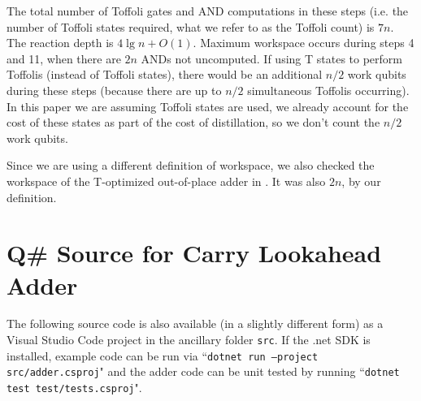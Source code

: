 \documentclass[onecolumn,unpublished]{quantumarticle}
\theoremstyle{definition}
\theoremstyle{definition}
\theoremstyle{definition}
\begin{document}
The total number of Toffoli gates and AND computations in these steps (i.e. the number of Toffoli states required, what we refer to as the Toffoli count) is $7n$.
The reaction depth is $4 \lg n + O(1)$.
Maximum workspace occurs during steps 4 and 11, when there are $2n$ ANDs not uncomputed.
If using T states to perform Toffolis (instead of Toffoli states), there would be an additional $n/2$ work qubits during these steps (because there are up to $n/2$ simultaneous Toffolis occurring).
In this paper we are assuming Toffoli states are used, we already account for the cost of these states as part of the cost of distillation, so we don't count the $n/2$ work qubits.

Since we are using a different definition of workspace, we also checked the workspace of the T-optimized out-of-place adder in \cite{thapliyal2020lookahead}.
It was also $2n$, by our definition.

\section{Q\# Source for Carry Lookahead Adder}

The following source code is also available (in a slightly different form) as a Visual Studio Code project in the ancillary folder \texttt{src}.
If the .net SDK is installed, example code can be run via ``\texttt{dotnet run --project src/adder.csproj}" and the adder code can be unit tested by running ``\texttt{dotnet test test/tests.csproj}".
\end{document}
